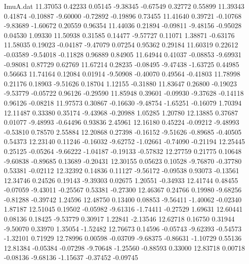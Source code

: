 \begin{filecontents}{ImuA.dat}
  11.37053    0.42233    0.05145   -9.38345   -0.67549    0.32772    0.55899
  11.39343    0.41874   -0.10887   -9.60000   -0.72892   -0.19896    0.73455
  11.41640    0.39721   -0.10768   -9.83689   -1.60672    0.20559    0.96354
  11.44036    0.21894   -0.09811   -9.48156   -0.95028    0.04530    1.09330
  11.50938    0.31585    0.14477   -9.57727    0.11071    1.38871   -0.63176
  11.58035    0.19023   -0.04187   -9.47079    0.07254    0.95362    0.29184
  11.60319    0.22612   -0.03589   -9.54018   -0.11828    0.96889    0.84905
  11.64944    0.41037   -0.08853   -9.69931   -0.98081    0.87729    0.62769
  11.67214    0.28235   -0.08495   -9.47438   -1.63725    0.44985    0.56663
  11.74164    0.12084    0.01914   -9.50908   -0.40070    0.49564   -0.41803
  11.78998    0.21176    0.18903   -9.51626    0.18704    1.12155   -0.31880
  11.83647    0.26800   -0.19023   -9.53779   -0.05722    0.96126   -0.29590
  11.85948    0.39601   -0.09930   -9.37628   -0.14118    0.96126   -0.08218
  11.97573    0.30867   -0.16630   -9.48754   -1.65251   -0.16079    1.70394
  12.11487    0.33380    0.35174   -9.43968   -0.20988    1.05285    1.20780
  12.13885    0.37687    0.01077   -9.48993   -0.64496    0.93836    2.45961
  12.16180    0.45224   -0.09212   -9.48993   -0.53810    0.78570    2.55884
  12.20868    0.27398   -0.16152   -9.51626   -0.89685   -0.40505    0.54373
  12.23140    0.11246   -0.16032   -9.62752   -1.02661   -0.74090   -0.21194
  12.25445    0.25125   -0.05264   -9.66222   -1.04187   -0.19133   -0.57832
  12.27759    0.21775    0.10648   -9.60838   -0.89685    0.13689   -0.20431
  12.30155    0.05623    0.10528   -9.76870   -0.37780    0.53381   -0.02112
  12.32392    0.14836    0.11127   -9.56172   -0.09538    0.93073   -0.13561
  12.34746    0.24526    0.19143   -9.39303    0.02675    1.20551   -0.34933
  12.41744    0.48455   -0.07059   -9.43011   -0.25567    0.53381   -0.27300
  12.46367    0.24766    0.19980   -9.68256   -0.81288   -0.39742    1.24596
  12.48750    0.13400    0.08853   -9.56411   -1.40062   -0.02340    1.87187
  12.51045    0.19502   -0.05982   -9.61316   -1.74411   -0.27529    1.69631
  12.60441    0.08136    0.18425   -9.53779    0.30917    1.22841   -2.13546
  12.62718    0.16750    0.31944   -9.50070    0.33970    1.35054   -1.52482
  12.76673    0.14596   -0.05743   -9.62393   -0.54573   -1.32101    0.71929
  12.78996    0.00598   -0.03709   -9.68375   -0.86631   -1.10729    0.55136
  12.81384   -0.05384   -0.07298   -9.70648   -1.25560   -0.88593    0.33000
  12.83718    0.00718   -0.08136   -9.68136   -1.15637   -0.37452   -0.09745

\end{filecontents}
